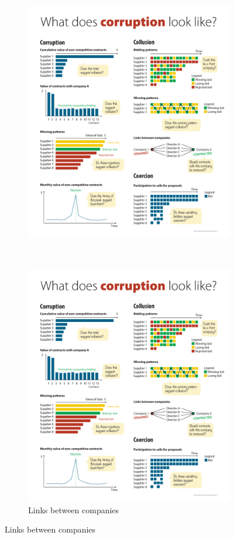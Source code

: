 \begin{figure}[H]
\begin{subfigure}[t]{0.5\textwidth}
\includegraphics[max width=1\textwidth]{../img/poster_monthly.pdf}
\end{subfigure}
~
\begin{subfigure}[t]{0.5\textwidth}
\caption{Links between companies}
\label{fig_links}
\includegraphics[max width=1\textwidth]{../img/poster_link.pdf}

\end{subfigure}
\end{figure}
